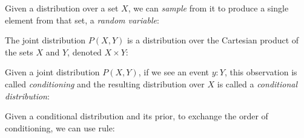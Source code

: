 \documentclass{article}
\begin{document}
Given a distribution over a set $X$, we can \textit{sample} from it to produce a single element from that set, a \textit{random variable}:

\begin{prooftree}
\end{prooftree}

%

The joint distribution $P(X, Y)$ is a distribution over the Cartesian product of the sets $X$ and $Y$, denoted $X \times Y$:

\begin{prooftree}
\end{prooftree}

Given a joint distribution $P(X, Y)$, if we see an event $y: Y$, this observation is called \textit{conditioning} and the resulting distribution over $X$ is called a \textit{conditional distribution}:


\begin{prooftree}
\end{prooftree}


Given a conditional distribution and its prior, to exchange the order of conditioning, we can use \citet{bayes1763essay} rule:

\begin{prooftree}
\end{prooftree}
\end{document}

